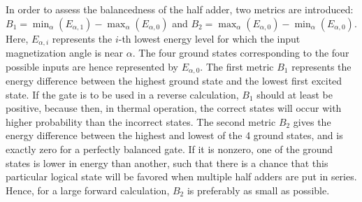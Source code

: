 \documentclass[twocolumn]{phdsymp}
\begin{document}
In order to assess the balancedness of the half adder, two metrics are introduced: $B_1 = \min_\alpha(E_{\alpha,1}) - \max_\alpha(E_{\alpha,0})$ and $B_2 = \max_\alpha(E_{\alpha,0}) - \min_\alpha(E_{\alpha,0})$. Here, $E_{\alpha,i}$ represents the $i$-th lowest energy level for which the input magnetization angle is near $\alpha$. The four ground states corresponding to the four possible inputs are hence represented by $E_{\alpha,0}$. The first metric $B_1$ represents the energy difference between the highest ground state and the lowest first excited state. If the gate is to be used in a reverse calculation, $B_1$ should at least be positive, because then, in thermal operation, the correct states will occur with higher probability than the incorrect states. The second metric $B_2$ gives the energy difference between the highest and lowest of the 4 ground states, and is exactly zero for a perfectly balanced gate. If it is nonzero, one of the ground states is lower in energy than another, such that there is a chance that this particular logical state will be favored when multiple half adders are put in series. Hence, for a large forward calculation, $B_2$ is preferably as small as possible. \par
\end{document}
